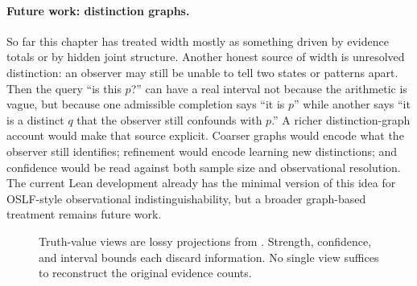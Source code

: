 \documentclass[11pt,openany]{report}
\begin{document}
\paragraph{Future work: distinction graphs.}
So far this chapter has treated width mostly as something driven by evidence
totals or by hidden joint structure.  Another honest source of width is
unresolved distinction: an observer may still be unable to tell two states or
patterns apart.  Then the query ``is this $p$?'' can have a real interval not
because the arithmetic is vague, but because one admissible completion says
``it is $p$'' while another says ``it is a distinct $q$ that the observer still
confounds with $p$.''  A richer distinction-graph account would make that
source explicit.  Coarser graphs would encode what the observer still
identifies; refinement would encode learning new distinctions; and confidence
would be read against both sample size and observational resolution.  The
current Lean development already has the minimal version of this idea for
OSLF-style observational indistinguishability, but a broader graph-based
treatment remains future work.

\begin{figure}[htbp]
\centering
{}
\caption{Truth-value views are lossy projections from \Evidence{}.
Strength, confidence, and interval bounds each discard information.
No single view suffices to reconstruct the original evidence counts.}
\label{fig:tv-views-projections}
\end{figure}
\end{document}
